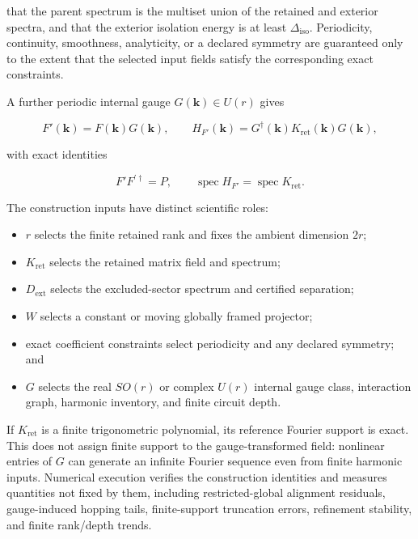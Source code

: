 \documentclass[11pt]{article}
\begin{document}
that the parent spectrum is the multiset union of the retained and exterior spectra,
and that the exterior isolation energy is at least $\Delta_{\mathrm{iso}}$. Periodicity,
continuity, smoothness, analyticity, or a declared symmetry are guaranteed only to the
extent that the selected input fields satisfy the corresponding exact constraints.

A further periodic internal gauge $G(\mathbf k)\in U(r)$ gives

\begin{equation}
 F'(\mathbf k)=F(\mathbf k)G(\mathbf k),
 \qquad
 H_{F'}(\mathbf k)=G^\dagger(\mathbf k)
 K_{\mathrm{ret}}(\mathbf k)G(\mathbf k),
 \label{eq:general-construction-gauge}
\end{equation}

with exact identities

\begin{equation}
 F'F^{\prime\dagger}=P,
 \qquad
 \operatorname{spec}H_{F'}=\operatorname{spec}K_{\mathrm{ret}}.
 \label{eq:general-construction-gauge-guarantees}
\end{equation}

The construction inputs have distinct scientific roles:

\begin{itemize}
\item $r$ selects the finite retained rank and fixes the ambient dimension $2r$;
\item $K_{\mathrm{ret}}$ selects the retained matrix field and spectrum;
\item $D_{\mathrm{ext}}$ selects the excluded-sector spectrum and certified separation;
\item $W$ selects a constant or moving globally framed projector;
\item exact coefficient constraints select periodicity and any declared symmetry; and
\item $G$ selects the real $SO(r)$ or complex $U(r)$ internal gauge class, interaction
      graph, harmonic inventory, and finite circuit depth.
\end{itemize}

If $K_{\mathrm{ret}}$ is a finite trigonometric polynomial, its reference Fourier
support is exact. This does not assign finite support to the gauge-transformed field:
nonlinear entries of $G$ can generate an infinite Fourier sequence even from finite
harmonic inputs. Numerical execution verifies the construction identities and measures
quantities not fixed by them, including restricted-global alignment residuals,
gauge-induced hopping tails, finite-support truncation errors, refinement stability,
and finite rank/depth trends.
\end{document}
